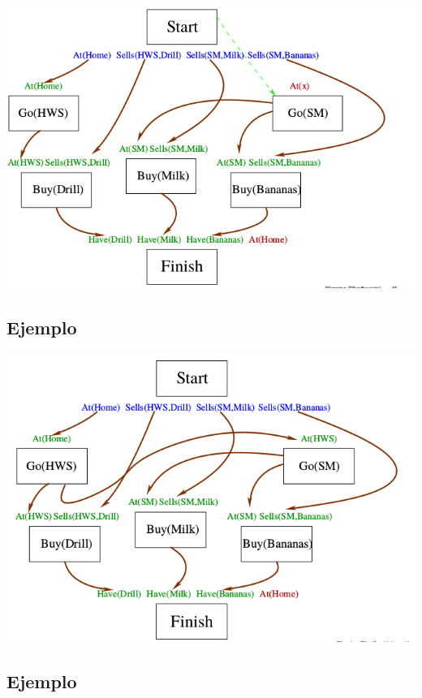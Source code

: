 \documentclass[11pt]{article}
\begin{document}
\begin{center}
\includegraphics[width=.9\linewidth]{imagenes/pop17.png}
\end{center}

\subsection*{Ejemplo}
\label{sec:org9e706a0}

\begin{center}
\includegraphics[width=.9\linewidth]{imagenes/pop18.png}
\end{center}

\subsection*{Ejemplo}
\label{sec:orgf38862b}
\end{document}
